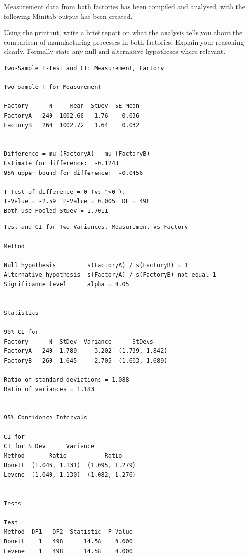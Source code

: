 \documentclass[a4paper,12pt]{article}
\begin{document}
\noindent Measurement data from both factories has been compiled and analysed, with the following Minitab output has been created.\\ \smallskip

\noindent Using the printout, write a brief report on what the analysis tells you about the comparison of manufacturing processes in both factories. Explain your reasoning clearly. Formally state any null and alternative hypotheses where relevant.
\begin{framed}
\begin{verbatim}
Two-Sample T-Test and CI: Measurement, Factory 

Two-sample T for Measurement

Factory      N     Mean  StDev  SE Mean
FactoryA   240  1002.60   1.76    0.036
FactoryB   260  1002.72   1.64    0.032


Difference = mu (FactoryA) - mu (FactoryB)
Estimate for difference:  -0.1248
95% upper bound for difference:  -0.0456

T-Test of difference = 0 (vs "<0"): 
T-Value = -2.59  P-Value = 0.005  DF = 498
Both use Pooled StDev = 1.7011
\end{verbatim}
\end{framed}

\begin{framed}
\begin{verbatim}
Test and CI for Two Variances: Measurement vs Factory 

Method

Null hypothesis         s(FactoryA) / s(FactoryB) = 1
Alternative hypothesis  s(FactoryA) / s(FactoryB) not equal 1
Significance level      alpha = 0.05


Statistics

95% CI for
Factory      N  StDev  Variance      StDevs
FactoryA   240  1.789     3.202  (1.739, 1.842)
FactoryB   260  1.645     2.705  (1.603, 1.689)

Ratio of standard deviations = 1.088
Ratio of variances = 1.183


95% Confidence Intervals

CI for
CI for StDev      Variance
Method       Ratio           Ratio
Bonett  (1.046, 1.131)  (1.095, 1.279)
Levene  (1.040, 1.130)  (1.082, 1.276)


Tests

Test
Method  DF1   DF2  Statistic  P-Value
Bonett    1   498      14.58    0.000
Levene    1   498      14.58    0.000
\end{verbatim}
\end{framed}
\newpage
\end{document}
